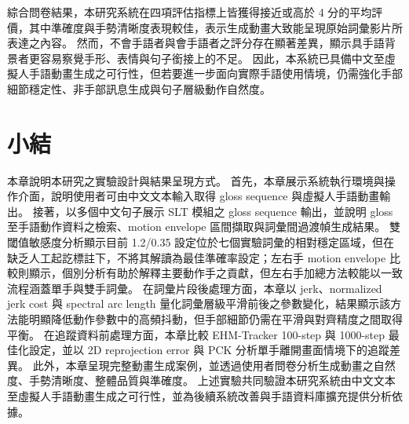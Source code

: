 \documentclass[class=NCU_thesis, crop=false]{standalone}
\begin{document}
綜合問卷結果，本研究系統在四項評估指標上皆獲得接近或高於 4 分的平均評價，其中準確度與手勢清晰度表現較佳，表示生成動畫大致能呈現原始詞彙影片所表達之內容。
然而，不會手語者與會手語者之評分存在顯著差異，顯示具手語背景者更容易察覺手形、表情與句子銜接上的不足。
因此，本系統已具備中文至虛擬人手語動畫生成之可行性，但若要進一步面向實際手語使用情境，仍需強化手部細節穩定性、非手部訊息生成與句子層級動作自然度。

\section{小結}
\label{sec:exp_summary}

本章說明本研究之實驗設計與結果呈現方式。
首先，本章展示系統執行環境與操作介面，說明使用者可由中文文本輸入取得 gloss sequence 與虛擬人手語動畫輸出。
接著，以多個中文句子展示 SLT 模組之 gloss sequence 輸出，並說明 gloss 至手語動作資料之檢索、motion envelope 區間擷取與詞彙間過渡幀生成結果。
雙閾值敏感度分析顯示目前 1.2/0.35 設定位於七個實驗詞彙的相對穩定區域，但在缺乏人工起訖標註下，不將其解讀為最佳準確率設定；左右手 motion envelope 比較則顯示，個別分析有助於解釋主要動作手之貢獻，但左右手加總方法較能以一致流程涵蓋單手與雙手詞彙。
在詞彙片段後處理方面，本章以 jerk、normalized jerk cost 與 spectral arc length 量化詞彙層級平滑前後之參數變化，結果顯示該方法能明顯降低動作參數中的高頻抖動，但手部細節仍需在平滑與對齊精度之間取得平衡。
在追蹤資料前處理方面，本章比較 EHM-Tracker 100-step 與 1000-step 最佳化設定，並以 2D reprojection error 與 PCK 分析單手離開畫面情境下的追蹤差異。
此外，本章呈現完整動畫生成案例，並透過使用者問卷分析生成動畫之自然度、手勢清晰度、整體品質與準確度。
上述實驗共同驗證本研究系統由中文文本至虛擬人手語動畫生成之可行性，並為後續系統改善與手語資料庫擴充提供分析依據。
\end{document}
